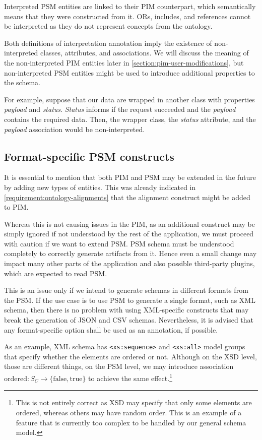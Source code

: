 Interpreted PSM entities are linked to their PIM counterpart, which semantically means that they were constructed from it. ORs, includes, and references cannot be interpreted as they do not represent concepts from the ontology.

\medskip

Both definitions of interpretation annotation imply the existence of non-interpreted classes, attributes, and associations. We will discuss the meaning of the non-interpreted PIM entities later in \autoref{section:pim-user-modifications}, but non-interpreted PSM entities might be used to introduce additional properties to the schema.

For example, suppose that our data are wrapped in another class with properties \textit{payload} and \textit{status}. \textit{Status} informs if the request succeeded and the \textit{payload} contains the required data. Then, the wrapper class, the \textit{status} attribute, and the \textit{payload} association would be non-interpreted.

\subsection{Format-specific PSM constructs}

It is essential to mention that both PIM and PSM may be extended in the future by adding new types of entities. This was already indicated in \autoref{requirement:ontology-alignments} that the alignment construct might be added to PIM.

Whereas this is not causing issues in the PIM, as an additional construct may be simply ignored if not understood by the rest of the application, we must proceed with caution if we want to extend PSM. PSM schema must be understood completely to correctly generate artifacts from it. Hence even a small change may impact many other parts of the application and also possible third-party plugins, which are expected to read PSM.

This is an issue only if we intend to generate schemas in different formats from the PSM. If the use case is to use PSM to generate a single format, such as XML schema, then there is no problem with using XML-specific constructs that may break the generation of JSON and CSV schemas. Nevertheless, it is advised that any format-specific option shall be used as an annotation, if possible.

As an example, XML schema has \verb|<xs:sequence>| and \verb|<xs:all>| model groups that specify whether the elements are ordered or not. Although on the XSD level, those are different things, on the PSM level, we may introduce association $\textrm{ordered}: S_C \rightarrow \{\textrm{false}, \textrm{true}\}$ to achieve the same effect.\footnote{This is not entirely correct as XSD may specify that only some elements are ordered, whereas others may have random order. This is an example of a feature that is currently too complex to be handled by our general schema model.}

